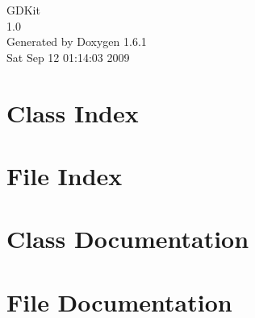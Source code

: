 \documentclass[a4paper]{book}
\begin{document}
\hypersetup{pageanchor=false}
\begin{titlepage}
\vspace*{7cm}
\begin{center}
{\Large GDKit \\[1ex]\large 1.0 }\\
\vspace*{1cm}
{\large Generated by Doxygen 1.6.1}\\
\vspace*{0.5cm}
{\small Sat Sep 12 01:14:03 2009}\\
\end{center}
\end{titlepage}
\clearemptydoublepage
{}
\tableofcontents
\clearemptydoublepage
{}
\hypersetup{pageanchor=true}
\chapter{Class Index}

\chapter{File Index}

\chapter{Class Documentation}


















\chapter{File Documentation}















\printindex
\end{document}
